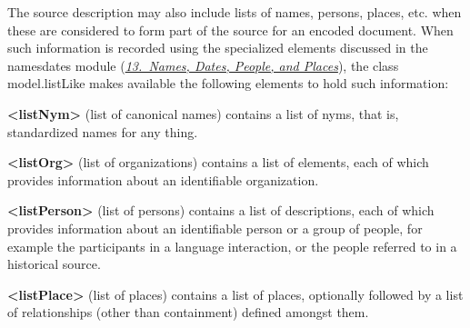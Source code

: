 The source description may also include lists of names, persons, places, etc. when these are considered to form part of the source for an encoded document. When such information is recorded using the specialized elements discussed in the \textsf{namesdates} module (\textit{\hyperref[ND]{13.\ Names, Dates, People, and Places}}), the class \textsf{model.listLike} makes available the following elements to hold such information: 
\begin{sansreflist}
  
\item [\textbf{<listNym>}] (list of canonical names) contains a list of nyms, that is, standardized names for any thing.
\item [\textbf{<listOrg>}] (list of organizations) contains a list of elements, each of which provides information about an identifiable organization.
\item [\textbf{<listPerson>}] (list of persons) contains a list of descriptions, each of which provides information about an identifiable person or a group of people, for example the participants in a language interaction, or the people referred to in a historical source.
\item [\textbf{<listPlace>}] (list of places) contains a list of places, optionally followed by a list of relationships (other than containment) defined amongst them.
\end{sansreflist}

